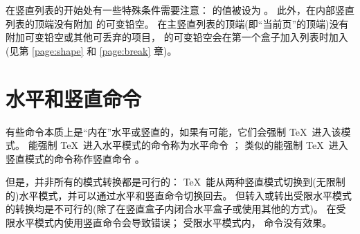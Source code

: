 \documentclass{book}
\begin{document}
在竖直列表的开始处有一些特殊条件需要注意：
 的值被设为 \n{-1000pt}。
此外，在内部竖直列表的顶端没有附加  的可变铅空。
在主竖直列表的顶端(即“当前页”的顶端)没有附加可变铅空或其他可丢弃的项目，
 的可变铅空会在第一个盒子加入列表时加入
(见第 \ref{page:shape} 和 \ref{page:break} 章)。

\section{水平和竖直命令}

有些命令本质上是“内在”水平或竖直的，如果有可能，它们会强制 \TeX\ 进入该模式。
能强制 \TeX\ 进入水平模式的命令称为水平命令 ；
类似的能强制 \TeX\ 进入竖直模式的命令称作竖直命令 。

但是，并非所有的模式转换都是可行的：
\TeX\ 能从两种竖直模式切换到(无限制的)水平模式，并可以通过水平和竖直命令切换回去。
但转入或转出受限水平模式的转换均是不可行的(除了在竖直盒子内闭合水平盒子或使用其他的方式)。
在受限水平模式内使用竖直命令会导致错误；
受限水平模式内， 命令没有效果。
\end{document}
